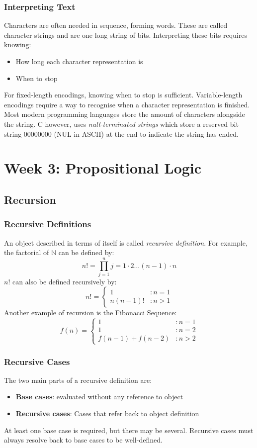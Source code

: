 \documentclass{article}
\begin{document}
\subsubsection{Interpreting Text}
Characters are often needed in sequence, forming words.
These are called character strings and are one long string of bits.
Interpreting these bits requires knowing:
\begin{itemize}
    \item How long each character representation is
    \item When to stop
\end{itemize}
For fixed-length encodings, knowing when to stop is sufficient.
Variable-length encodings require a way to recognise when a character representation is finished.
Most modern programming languages store the amount of characters alongside the string.
C however, uses \emph{null-terminated strings} which store a reserved bit string 00000000 (NUL in ASCII)
at the end to indicate the string has ended.

\newpage
\section{Week 3: Propositional Logic}
\subsection{Recursion}
\subsubsection{Recursive Definitions}
An object described in terms of itself is called \emph{recursive definition}.
For example, the factorial of \(\mathbb{N}\) can be defined by:
\[n! = \prod_{j=1}^{n} j = 1 \cdot 2 \dots (n-1) \cdot n\]
\(n!\) can also be defined recursively by:
\[
    n! = 
    \begin{cases}
        1       &: n = 1 \\
        n(n-1)! &: n > 1
    \end{cases}
\]
Another example of recursion is the Fibonacci Sequence:
\[
    f(n) = 
    \begin{cases}
        1               &: n = 1 \\
        1               &: n = 2 \\
        f(n-1) + f(n-2) &: n > 2
    \end{cases}
\]
%
\subsubsection{Recursive Cases}
The two main parts of a recursive definition are:
\begin{itemize}
    \item \textbf{Base cases}: evaluated without any reference to object
    \item \textbf{Recursive cases}: Cases that refer back to object definition
\end{itemize}
At least one base case is required, but there may be several.
Recursive cases must always resolve back to base cases to be well-defined.
\end{document}
